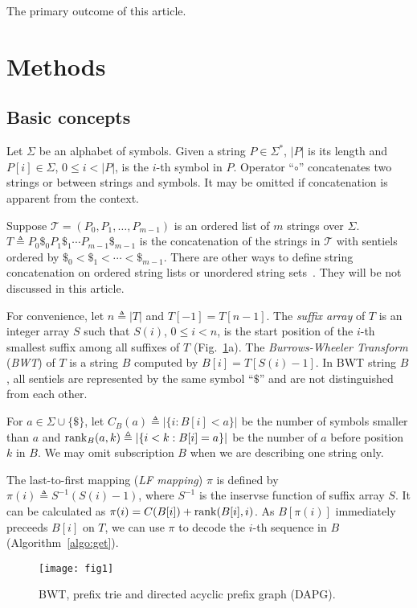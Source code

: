 \documentclass[webpdf,contemporary,large,namedate]{oup-authoring-template}%
\begin{document}
The primary outcome of this article.

\section{Methods}

\subsection{Basic concepts}

Let $\Sigma$ be an alphabet of symbols.
Given a string $P\in\Sigma^*$, $|P|$ is its length and $P[i]\in\Sigma$, $0\le i<|P|$, is the $i$-th symbol in $P$.
Operator ``$\circ$'' concatenates two strings or between strings and symbols.
It may be omitted if concatenation is apparent from the context.

Suppose $\mathcal{T}=(P_0,P_1,\ldots,P_{m-1})$ is an ordered list of $m$ strings over $\Sigma$.
$T\triangleq P_0\$_0P_1\$_1\cdots P_{m-1}\$_{m-1}$ is the concatenation of the strings in $\mathcal{T}$
with sentiels ordered by $\$_0<\$_1<\cdots<\$_{m-1}$.
There are other ways to define string concatenation on ordered string lists or unordered string sets~\citep{Cenzato:2024ab,Li:2014ab}.
They will be not discussed in this article.

For convenience, let $n\triangleq|T|$ and $T[-1]=T[n-1]$.
The \emph{suffix array} of $T$ is an integer array $S$ such that $S(i)$,
$0\le i<n$, is the start position of the $i$-th smallest suffix among all suffixes of $T$ (Fig.~\ref{fig:1}a).
The \emph{Burrows-Wheeler Transform} (\emph{BWT}) of $T$ is a string $B$ computed by $B[i]=T[S(i)-1]$.
In BWT string $B$, all sentiels are represented by the same symbol ``$\$$'' and are not distinguished from each other.

For $a\in\Sigma\cup\{\$\}$, let $C_B(a)\triangleq|\{i:B[i]<a\}|$ be the number of symbols smaller than $a$
and ${\rm rank}_B(a,k)\triangleq|\{i<k:B[i]=a\}|$ be the number of $a$ before position $k$ in $B$.
We may omit subscription $B$ when we are describing one string only.

The last-to-first mapping (\emph{LF mapping}) $\pi$ is defined by $\pi(i)\triangleq S^{-1}(S(i)-1)$,
where $S^{-1}$ is the inservse function of suffix array $S$.
It can be calculated as $\pi(i)=C(B[i])+{\rm rank}(B[i],i)$.
As $B[\pi(i)]$ immediately preceeds $B[i]$ on $T$, we can use $\pi$ to decode the $i$-th sequence in $B$ (Algorithm~\ref{algo:get}).

\begin{figure}[tb]
\centering
\texttt{[image: fig1]}
\caption{BWT, prefix trie and directed acyclic prefix graph (DAPG).}\label{fig:1}
\end{figure}
\end{document}

